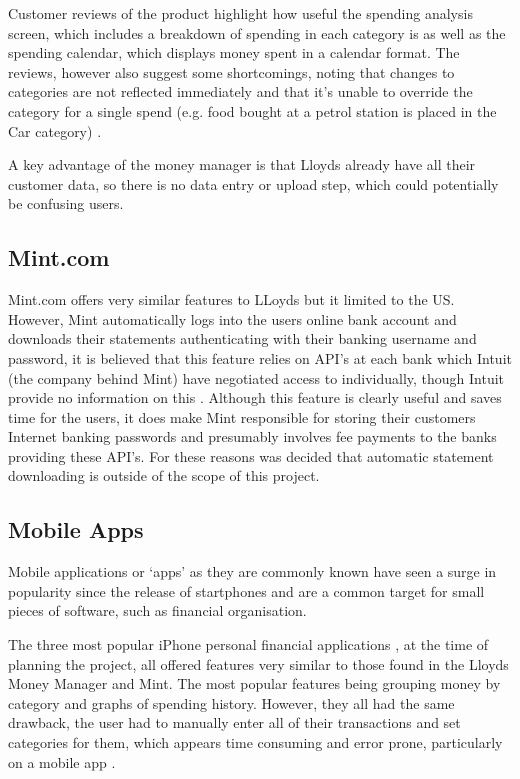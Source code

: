 Customer reviews of the product highlight how useful the spending analysis screen, which includes a breakdown of spending in each category is as well as the spending calendar, which displays money spent in a calendar format. The reviews, however also suggest some shortcomings, noting that changes to categories are not reflected immediately and that it's unable to override the category for a single spend (e.g. food bought at a petrol station is placed in the Car category) \cite{moneywatch2011lloyds}.

A key advantage of the money manager is that Lloyds already have all their customer data, so there is no data entry or upload step, which could potentially be confusing users.

\subsection{Mint.com}
Mint.com offers very similar features to LLoyds but it limited to the US. However, Mint automatically logs into the users online bank account and downloads their statements authenticating with their banking username and password, it is believed that this feature relies on API's at each bank which Intuit (the company behind Mint) have negotiated access to individually, though Intuit provide no information on this \cite{stackoverflow2012bankingapi, stackoverflow2012bankingapi2}. Although this feature is clearly useful and saves time for the users, it does make Mint responsible for storing their customers Internet banking passwords and presumably involves fee payments to the banks providing these API's. For these reasons was decided that automatic statement downloading is outside of the scope of this project.


\subsection{Mobile Apps}
Mobile applications or `apps' as they are commonly known have seen a surge in popularity since the release of startphones and are a common target for small pieces of software, such as financial organisation.

The three most popular iPhone personal financial applications \cite{itunes2013topapps}, at the time of planning the project, all offered features very similar to those found in the Lloyds Money Manager and Mint. The most popular features being grouping money by category and graphs of spending history. However, they all had the same drawback, the user had to manually enter all of their transactions and set categories for them, which appears time consuming and error prone, particularly on a mobile app \cite{spendee2014spendee,budgt2013budgt,bluetags2014pocket}.

